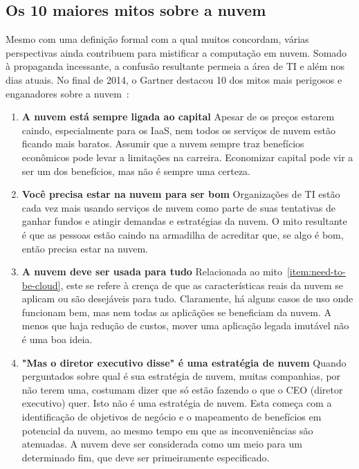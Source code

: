 \subsection{Os 10 maiores mitos sobre a nuvem}

Mesmo com uma definição formal com a qual muitos concordam, várias perspectivas 
ainda contribuem para mistificar a computação em nuvem. Somado à propaganda 
incessante, a confusão resultante permeia a área de TI e além nos dias atuais. No 
final de 2014, o Gartner destacou 10 dos mitos mais perigosos e enganadores sobre a 
nuvem~\cite{gartner-10-myths-cloud}:
	
\newcommand{\itemm}[1]{\item\textbf{#1}\newline}	

\begin{enumerate}
    \itemm{A nuvem está sempre ligada ao capital}
		Apesar de os preços estarem caindo, especialmente para os IaaS, nem todos os 
		serviços de nuvem estão ficando mais baratos. Assumir que a nuvem sempre 
		traz benefícios econômicos pode levar a limitações na carreira. Economizar 
		capital pode vir a ser um dos benefícios, mas não é sempre uma certeza.

    \itemm{Você precisa estar na nuvem para ser bom}\label{item:need-to-be-cloud}
		Organizações de TI estão cada vez mais usando serviços de nuvem como parte 
		de suas tentativas de ganhar fundos e atingir demandas e estratégias da 
		nuvem. O mito resultante é que as pessoas estão caindo na armadilha de 
		acreditar que, se algo é bom, então precisa estar na nuvem.

    \itemm{A nuvem deve ser usada para tudo}
		Relacionada ao mito~\ref{item:need-to-be-cloud}, este se refere à crença de 
		que as características reais da nuvem se aplicam ou são desejáveis para 
		tudo. Claramente, há alguns casos de uso onde funcionam bem, mas nem todas 
		as aplicãções se beneficiam da nuvem. A menos que haja redução de custos, 
		mover uma aplicação legada imutável não é uma boa ideia.

    \itemm{"Mas o diretor executivo disse" é uma estratégia de nuvem}
		Quando perguntados sobre qual é sua estratégia de nuvem, muitas companhias, 
		por não terem uma, costumam dizer que só estão fazendo o que o CEO (diretor 
		executivo) quer. Isto não é uma estratégia de nuvem. Esta começa com a 
		identificação de objetivos de negócio e o mapeamento de benefícios em 
		potencial da nuvem, ao mesmo tempo em que as inconveniências são atenuadas. 
		A nuvem deve ser considerada como um meio para um determinado fim, que deve 
		ser primeiramente especificado.


\end{enumerate}
